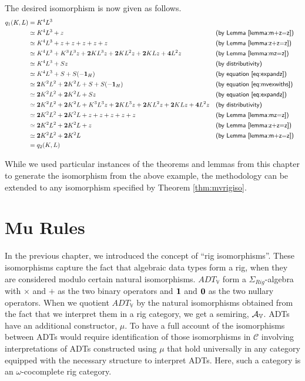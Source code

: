 \documentclass{msthesis}
\theoremstyle{definition}
\newcommand{\hi}[1]{\textcolor{red}{#1}}
\newcommand{\mcC}{\mathcal{C}}
\newcommand{\vars}{\mathbb{V}}
\begin{document}
The desired isomorphism is now given as follows.
\begin{align*}
    q_1(K,L)
    &= K^4L^3 \\ 
    &\simeq K^4L^3 + z && \textsf{(by Lemma \ref{lemma:m+z=z})} \\
    &\simeq K^4L^3 + z + z + z + z + z && \textsf{(by Lemma \ref{lemma:z+z=z})} \\
    &\simeq K^4L^3 + K^3L^3z + \mathbf{2}KL^3z + \mathbf{2}KL^2z + \mathbf{2}KLz + \mathbf{4}L^2z &&\textsf{(by Lemma \ref{lemma:mz=z})} \\
    &\simeq K^4L^3 + Sz && \textsf{(by distributivity)} \\
    &\simeq K^4L^3 + S + S(-\mathbf{1}_H) && \textsf{(by equation \eqref{eq:expandz})} \\
    &\simeq \mathbf{2}K^2L^2 + \mathbf{2}K^2L + S + S(-\mathbf{1}_H) && \textsf{(by equation \eqref{eq:mvexwiths})} \\
    &\simeq \mathbf{2}K^2L^2 + \mathbf{2}K^2L + Sz && \textsf{(by equation \eqref{eq:expandz})} \\
    &\simeq \mathbf{2}K^2L^2 + \mathbf{2}K^2L + K^3L^3z + \mathbf{2}KL^3z + \mathbf{2}KL^2z + \mathbf{2}KLz + \mathbf{4}L^2z && \textsf{(by distributivity)} \\
    &\simeq \mathbf{2}K^2L^2 + \mathbf{2}K^2L + z + z + z + z + z &&\textsf{(by Lemma \ref{lemma:mz=z})} \\
    &\simeq \mathbf{2}K^2L^2 + \mathbf{2}K^2L + z && \textsf{(by Lemma \ref{lemma:z+z=z})} \\
    &\simeq \mathbf{2}K^2L^2 + \mathbf{2}K^2L && \textsf{(by Lemma \ref{lemma:m+z=z})} \\
    &= q_2(K,L)
\end{align*}

While we used particular instances of the theorems and lemmas from this chapter to generate the isomorphism from the above example, the methodology can be extended to any isomorphism specified by Theorem \ref{thm:mvrigiso}.

\chapter{Mu Rules}\label{sec:murules}

In the previous chapter, we introduced the concept of ``rig isomorphisms''.  These isomorphisms capture the fact that algebraic data types form a rig, when they are considered modulo certain natural isomorphisms.  $ADT_\vars$ form a $\Sigma_{Rig}$-algebra with $\times$ and $+$ as the two binary operators and $\mathbf{1}$ and $\mathbf{0}$ as the two nullary operators.  When we quotient $ADT_\vars$ by the natural isomorphisms obtained from the fact that we interpret them in a rig category, we get a semiring, $\ADTrig$.  ADTs have an additional constructor, $\mu$.  To have a full account of the isomorphisms between ADTs would require identification of those isomorphisms in $\mcC$ involving interpretations of ADTs constructed using $\mu$ that hold universally in any category equipped with the necessary structure to interpret ADTs.  Here, such a category is an $\omega$-cocomplete rig category. 
\end{document}
